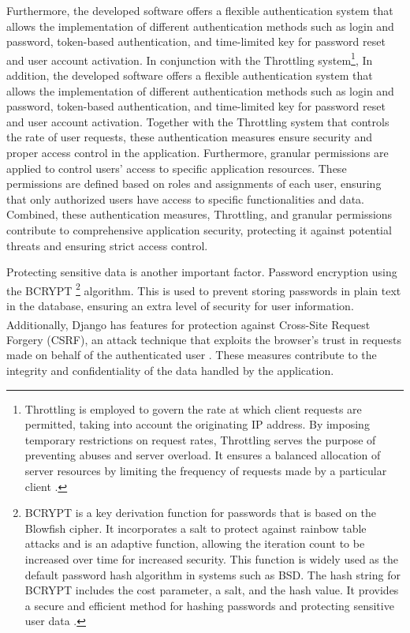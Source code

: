 Furthermore, the developed software offers a flexible authentication system that allows the implementation of different authentication methods such as login and password, token-based authentication, and time-limited key for password reset and user account activation. In conjunction with the Throttling system\footnote{Throttling is employed to govern the rate at which client requests are permitted, taking into account the originating IP address. By imposing temporary restrictions on request rates, Throttling serves the purpose of preventing abuses and server overload. It ensures a balanced allocation of server resources by limiting the frequency of requests made by a particular client \cite{drf-docs}.}, In addition, the developed software offers a flexible authentication system that allows the implementation of different authentication methods such as login and password, token-based authentication, and time-limited key for password reset and user account activation. Together with the Throttling system that controls the rate of user requests, these authentication measures ensure security and proper access control in the application. Furthermore, granular permissions are applied to control users' access to specific application resources. These permissions are defined based on roles and assignments of each user, ensuring that only authorized users have access to specific functionalities and data. Combined, these authentication measures, Throttling, and granular permissions contribute to comprehensive application security, protecting it against potential threats and ensuring strict access control.

Protecting sensitive data is another important factor. Password encryption using the BCRYPT \footnote{BCRYPT is a key derivation function for passwords that is based on the Blowfish cipher. It incorporates a salt to protect against rainbow table attacks and is an adaptive function, allowing the iteration count to be increased over time for increased security. This function is widely used as the default password hash algorithm in systems such as BSD. The hash string for BCRYPT includes the cost parameter, a salt, and the hash value. It provides a secure and efficient method for hashing passwords and protecting sensitive user data \cite{sriramya2015providing}.} algorithm. This is used to prevent storing passwords in plain text in the database, ensuring an extra level of security for user information. Additionally, Django\textsuperscript{\textregistered} has features for protection against Cross-Site Request Forgery (CSRF), an attack technique that exploits the browser's trust in requests made on behalf of the authenticated user \cite{django-docs}. These measures contribute to the integrity and confidentiality of the data handled by the application.

